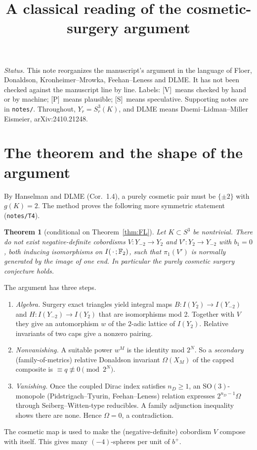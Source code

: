 \documentclass[10pt]{amsart}
\title{A classical reading of the cosmetic-surgery argument}
\date{}
\newtheorem{theorem}{Theorem}\newtheorem{lemma}[theorem]{Lemma}\newtheorem{proposition}[theorem]{Proposition}
\theoremstyle{definition}\newtheorem{definition}[theorem]{Definition}\newtheorem{remark}[theorem]{Remark}
\newcommand{\V}{\textsf{[V]}}\newcommand{\Pl}{\textsf{[P]}}\newcommand{\Sp}{\textsf{[S]}}
\begin{document}
\maketitle
\vspace{-2em}
\noindent\textit{Status.} This note reorganizes the manuscript's argument in the language of Floer, Donaldson, Kronheimer--Mrowka, Feehan--Leness and DLME. It has not been checked against the manuscript line by line. Labels: \V\ means checked by hand or by machine; \Pl\ means plausible; \Sp\ means speculative. Supporting notes are in \texttt{notes/}. Throughout, $Y_r=S^3_r(K)$, and DLME means Daemi--Lidman--Miller Eismeier, arXiv:2410.21248.

\section{The theorem and the shape of the argument}
By Hanselman and DLME (Cor.~1.4), a purely cosmetic pair must be $\{\pm2\}$ with $g(K)=2$. The method proves the following more symmetric statement (\texttt{notes/T4}).

\begin{theorem}[conditional on Theorem~\ref{thm:FL}]\label{thm:main}
Let $K\subset S^3$ be nontrivial. There do not exist negative-definite cobordisms $V\colon Y_{-2}\to Y_2$ and $V'\colon Y_2\to Y_{-2}$ with $b_1=0$, both inducing isomorphisms on $I(\,\cdot\,;\mathbb F_2)$, such that $\pi_1(V')$ is normally generated by the image of one end. In particular the purely cosmetic surgery conjecture holds.
\end{theorem}

\noindent The argument has three steps.
\begin{enumerate}
\item \emph{Algebra.} Surgery exact triangles yield integral maps $B\colon I(Y_2)\to I(Y_{-2})$ and $H\colon I(Y_{-2})\to I(Y_2)$ that are isomorphisms mod 2. Together with $V$ they give an automorphism $w$ of the $2$-adic lattice of $I(Y_2)$. Relative invariants of two caps give a nonzero pairing.
\item \emph{Nonvanishing.} A suitable power $w^M$ is the identity mod $2^N$. So a \emph{secondary} (family-of-metrics) relative Donaldson invariant $\Omega(X_M)$ of the capped composite is $\equiv q\not\equiv0\pmod{2^N}$.
\item \emph{Vanishing.} Once the coupled Dirac index satisfies $n_D\ge1$, an $\mathrm{SO}(3)$-monopole (Pidstrigach--Tyurin, Feehan--Leness) relation expresses $2^{n_D-1}\Omega$ through Seiberg--Witten-type reducibles. A family adjunction inequality shows there are none. Hence $\Omega=0$, a contradiction.
\end{enumerate}
The cosmetic map is used to make the (negative-definite) cobordism $V$ compose with itself. This gives many $(-4)$-spheres per unit of $b^+$.
\end{document}
